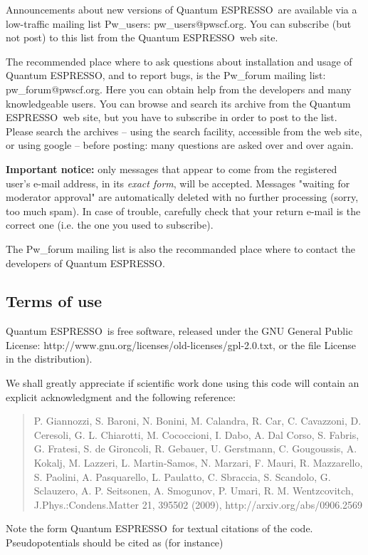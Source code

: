 \documentclass[12pt,a4paper]{article}
\def\qe{{\sc Quantum ESPRESSO}}
\begin{document}
Announcements about new versions of \qe\ are available 
via a low-traffic mailing list Pw\_users: pw\_users@pwscf.org. 
You can
subscribe (but not post) to this list from the \qe\ web site.
    
The recommended place where to ask questions about installation 
and usage of \qe, and to report bugs, is the Pw\_forum mailing
list: pw\_forum@pwscf.org. Here you can obtain help from the
developers and many knowledgeable users. You can browse 
and search its archive from the \qe\ web site, but you have to
subscribe in order to post to the list.
Please search the archives -- using the search facility, accessible
from the web site, or using google -- before posting: many 
questions are asked over and over again.

{\bf Important notice:} only messages that appear to come from the 
registered user's e-mail address, in its {\em exact form}, will be
accepted. Messages "waiting for moderator approval" are
automatically deleted with no further processing (sorry, too 
much spam). In case of trouble, carefully check that your return 
e-mail is the correct one 
(i.e. the one you used to subscribe).

The Pw\_forum mailing list is also the recommanded place where to 
contact the developers of \qe.
 
\subsection{Terms of use}

\qe\ is free software, released under the 
GNU General Public License:
http://www.gnu.org/licenses/old-licenses/gpl-2.0.txt, 
or the file License in the distribution).
    
We shall greatly appreciate if scientific work done using this code will 
contain an explicit acknowledgment and the following reference:
\begin{quote}
P. Giannozzi, S. Baroni, N. Bonini, M. Calandra, R. Car, C. Cavazzoni,
D. Ceresoli, G. L. Chiarotti, M. Cococcioni, I. Dabo, A. Dal Corso,
S. Fabris, G. Fratesi, S. de Gironcoli, R. Gebauer, U. Gerstmann,
C. Gougoussis, A. Kokalj, M. Lazzeri, L. Martin-Samos, N. Marzari,
F. Mauri, R. Mazzarello, S. Paolini, A. Pasquarello, L. Paulatto,
C. Sbraccia, S. Scandolo, G. Sclauzero, A. P. Seitsonen, A. Smogunov,
P. Umari, R. M. Wentzcovitch, J.Phys.:Condens.Matter 21, 395502 (2009),
http://arxiv.org/abs/0906.2569
\end{quote}
Note the form \qe\ for textual citations of the code.
Pseudopotentials should be cited as (for instance)
\end{document}
